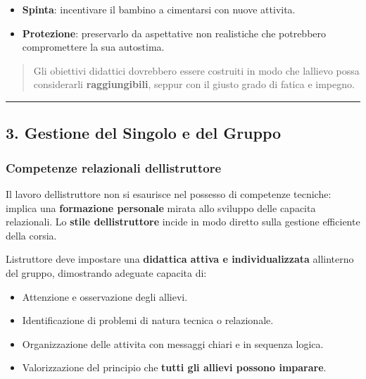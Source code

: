 \documentclass[a4paper,11pt]{article}
\providecommand{\tightlist}{%
  \setlength{\itemsep}{0pt}\setlength{\parskip}{0pt}}
\begin{document}
\begin{itemize}
      \tightlist
      \item
            \textbf{Spinta}: incentivare il bambino a cimentarsi con nuove
            attivita.
      \item
            \textbf{Protezione}: preservarlo da aspettative non realistiche che
            potrebbero compromettere la sua autostima.
\end{itemize}

\begin{quote}
      Gli obiettivi didattici dovrebbero essere costruiti in modo che
      l\textquotesingle allievo possa considerarli \textbf{raggiungibili},
      seppur con il giusto grado di fatica e impegno.
\end{quote}

\begin{center}\rule{0.5\linewidth}{0.5pt}\end{center}

\subsection{3. Gestione del Singolo e del
      Gruppo}\label{gestione-del-singolo-e-del-gruppo}

\subsubsection{Competenze relazionali
      dell\textquotesingle istruttore}\label{competenze-relazionali-dellistruttore}

Il lavoro dell\textquotesingle istruttore non si esaurisce nel possesso
di competenze tecniche: implica una \textbf{formazione personale} mirata
allo sviluppo delle capacita relazionali. Lo \textbf{stile
      dell\textquotesingle istruttore} incide in modo diretto sulla gestione
efficiente della corsia.

L\textquotesingle istruttore deve impostare una \textbf{didattica attiva
      e individualizzata} all\textquotesingle interno del gruppo, dimostrando
adeguate capacita di:

\begin{itemize}
      \tightlist
      \item
            Attenzione e osservazione degli allievi.
      \item
            Identificazione di problemi di natura tecnica o relazionale.
      \item
            Organizzazione delle attivita con messaggi chiari e in sequenza
            logica.
      \item
            Valorizzazione del principio che \textbf{tutti gli allievi possono
                  imparare}.
\end{itemize}
\end{document}
